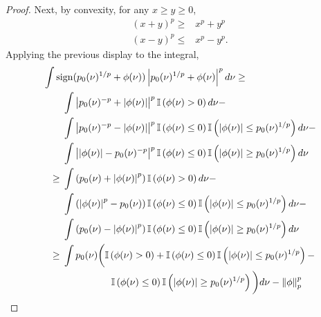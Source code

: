 \begin{lem}
\begin{proof}
Next, by convexity, for any $x \ge y \ge 0$,
%
\begin{align*}
%
(x + y)^p \ge{}& x^p + y^p \\
(x - y)^p \le{}& x^p - y^p.
%
\end{align*}
%
Applying the previous display to the integral,
%
\begin{align*}
%
\MoveEqLeft
\int \mathrm{sign}(\pbase(\nu)^{1/p} + \phi(\nu))
    \abs{\pbase(\nu)^{1/p} + \phi(\nu)}^{p} d\nu \ge{}\\&
    \int \abs{\pbase(\nu)^{-p} + \abs{\phi(\nu)} }^{p}
        \ind{\phi(\nu) > 0}
        d\nu - \\&
    \int \abs{\pbase(\nu)^{-p} - \abs{\phi(\nu)} }^{p}
        \ind{\phi(\nu) \le 0} \ind{\abs{\phi(\nu)} \le \pbase(\nu)^{1/p}}
        d\nu - \\&
    \int \abs{\abs{\phi(\nu)} - \pbase(\nu)^{-p} }^{p}
        \ind{\phi(\nu) \le 0} \ind{\abs{\phi(\nu)} \ge \pbase(\nu)^{1/p}}
        d\nu
\\\ge{}&
    \int \left(\pbase(\nu) + \abs{\phi(\nu)}^{p} \right)
        \ind{\phi(\nu) > 0}
        d\nu - \\&
    \int \left(\abs{\phi(\nu)}^{p}  - \pbase(\nu) \right)
        \ind{\phi(\nu) \le 0} \ind{\abs{\phi(\nu)} \le \pbase(\nu)^{1/p}}
        d\nu - \\&
    \int \left(\pbase(\nu) - \abs{\phi(\nu)}^{p} \right)
        \ind{\phi(\nu) \le 0} \ind{\abs{\phi(\nu)} \ge \pbase(\nu)^{1/p}}
        d\nu
\\\ge{}&
    \int \pbase(\nu) \bigg(
        \ind{\phi(\nu) > 0} +
        \ind{\phi(\nu) \le 0} \ind{\abs{\phi(\nu)} \le \pbase(\nu)^{1/p}} -
\\&\quad\quad\quad\quad\quad
        \ind{\phi(\nu) \le 0} \ind{\abs{\phi(\nu)} \ge \pbase(\nu)^{1/p}}
    \bigg) d\nu - \norm{\phi}_p^p
%
\end{align*}
%


%
\end{proof}
%
\end{lem}

